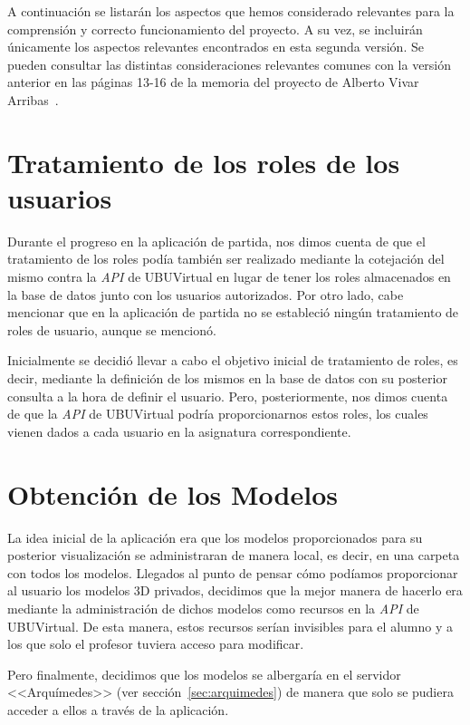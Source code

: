 A continuación se listarán los aspectos que hemos considerado relevantes para la comprensión y correcto funcionamiento del proyecto. A su vez, se incluirán únicamente los aspectos relevantes encontrados en esta segunda versión. Se pueden consultar las distintas consideraciones relevantes comunes con la versión anterior en las páginas 13-16 de la memoria del proyecto de Alberto Vivar Arribas~\cite{github:alberto-viewer}.

\section{Tratamiento de los roles de los usuarios}\label{sec:roles}
Durante el progreso en la aplicación de partida, nos dimos cuenta de que el tratamiento de los roles podía también ser realizado mediante la cotejación del mismo contra la \textit{API} de UBUVirtual en lugar de tener los roles almacenados en la base de datos junto con los usuarios autorizados. Por otro lado, cabe mencionar que en la aplicación de partida no se estableció ningún tratamiento de roles de usuario, aunque se mencionó.

Inicialmente se decidió llevar a cabo el objetivo inicial de tratamiento de roles, es decir, mediante la definición de los mismos en la base de datos con su posterior consulta a la hora de definir el usuario. Pero, posteriormente, nos dimos cuenta de que la \textit{API} de UBUVirtual podría proporcionarnos estos roles, los cuales vienen dados a cada usuario en la asignatura correspondiente.

\section{Obtención de los Modelos}
La idea inicial de la aplicación era que los modelos proporcionados para su posterior visualización se administraran de manera local, es decir, en una carpeta con todos los modelos. Llegados al punto de pensar cómo podíamos proporcionar al usuario los modelos 3D privados, decidimos que la mejor manera de hacerlo era mediante la administración de dichos modelos como recursos en la \textit{API} de UBUVirtual. De esta manera, estos recursos  serían invisibles para el alumno y a los que solo el profesor tuviera acceso para modificar.

Pero finalmente, decidimos que los modelos se albergaría en el servidor <<Arquímedes>> (ver sección~\ref{sec:arquimedes}) de manera que solo se pudiera acceder a ellos a través de la aplicación.

